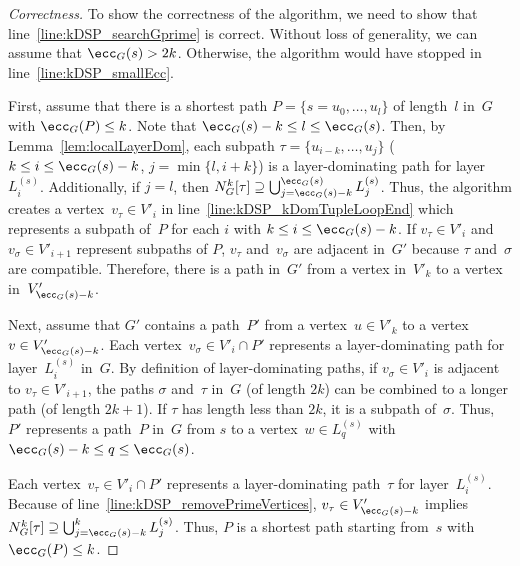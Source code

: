 \begin{proof}
    [Correctness]
To show the correctness of the algorithm, we need to show that line~\ref{line:kDSP_searchGprime} is correct.
Without loss of generality, we can assume that $\ecc_G(s) > 2k$.
Otherwise, the algorithm would have stopped in line~\ref{line:kDSP_smallEcc}.

First, assume that there is a shortest path $P = \{ s = u_0, \ldots, u_l \}$ of length~$l$ in~$G$ with $\ecc_G(P) \leq k$.
Note that $\ecc_G(s) - k \leq l \leq \ecc_G(s)$.
Then, by Lemma~\ref{lem:localLayerDom}, each subpath $\tau = \{ u_{i-k}, \ldots, u_j \}$ ($k \leq i \leq \ecc_G(s) - k$, $j = \min\{l, i+k\}$) is a layer-dominating path for layer~$L_i^{(s)}$.
Additionally, if $j = l$, then $N_G^k[\tau] \supseteq \bigcup_{j=\ecc_G(s) - k}^{\ecc_G(s)}L_j^{(s)}$.
Thus, the algorithm creates a vertex~$v_\tau \in V'_i$ in line~\ref{line:kDSP_kDomTupleLoopEnd} which represents a subpath of~$P$ for each $i$ with $k \leq i \leq \ecc_G(s) - k$.
If $v_\tau \in V'_i$ and $v_\sigma \in  V'_{i+1}$ represent subpaths of $P$, $v_\tau$ and~$v_\sigma$ are adjacent in~$G'$ because $\tau$ and~$\sigma$ are compatible.
Therefore, there is a path in~$G'$ from a vertex in~$V'_k$ to a vertex in~$V'_{\ecc_G(s)-k}$.

Next, assume that $G'$ contains a path~$P'$ from a vertex~$u \in V'_k$ to a vertex~$v \in V'_{\ecc_G(s) - k}$.
Each vertex~$v_\sigma \in V'_i \cap P'$ represents a layer-dominating path for layer~$L_i^{(s)}$ in~$G$.
By definition of layer-dominating paths, if $v_\sigma \in V'_i$ is adjacent to $v_\tau \in V'_{i+1}$, the paths $\sigma$ and~$\tau$ in~$G$ (of length $2k$) can be combined to a longer path (of length $2k + 1$).
If $\tau$ has length less than $2k$, it is a subpath of~$\sigma$.
Thus, $P'$ represents a path~$P$ in~$G$ from $s$ to a vertex~$w \in L_{q}^{(s)}$ with $\ecc_G(s)-k \leq q \leq \ecc_G(s)$.

Each vertex~$v_\tau \in V'_i \cap P'$ represents a layer-dominating path~$\tau$ for layer~$L_i^{(s)}$.
Because of line~\ref{line:kDSP_removePrimeVertices}, $v_\tau \in V'_{\ecc_G(s)-k}$ implies $N_G^k[\tau] \supseteq \bigcup_{j=\ecc_G(s) - k}^{k}L_j^{(s)}$.
Thus, $P$ is a shortest path starting from~$s$ with $\ecc_G(P) \leq k$.
\end{proof}

